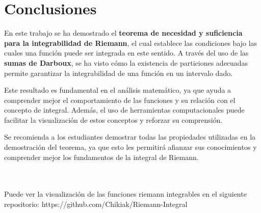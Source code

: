 \documentclass[10pt]{article}
\begin{document}
\section{Conclusiones}
En este trabajo se ha demostrado el \textbf{teorema de necesidad y suficiencia para la integrabilidad de Riemann}, el cual establece las condiciones bajo las cuales una función puede ser integrada en este sentido. A través del uso de las \textbf{sumas de Darboux}, se ha visto cómo la existencia de particiones adecuadas permite garantizar la integrabilidad de una función en un intervalo dado. \par

Este resultado es fundamental en el análisis matemático, ya que ayuda a comprender mejor el comportamiento de las funciones y su relación con el concepto de integral. Además, el uso de herramientas computacionales puede facilitar la visualización de estos conceptos y reforzar su comprensión. \par

Se recomienda a los estudiantes demostrar todas las propiedades utilizadas en la demostración del teorema, ya que esto les permitirá afianzar sus conocimientos y comprender mejor los fundamentos de la integral de Riemann. \par

\\\\
Puede ver la visualización de las funciones riemann integrables en el siguiente repositorio: https://github.com/Chikiak/Riemann-Integral
\end{document}
